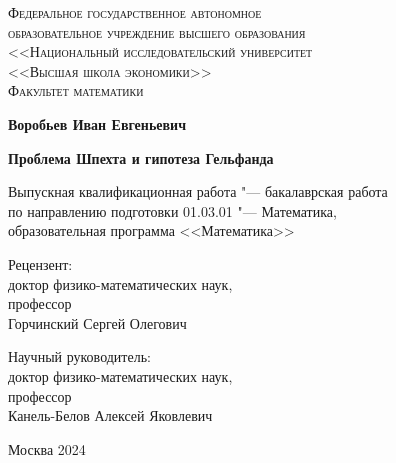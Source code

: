 \begin{center}
{\scshape Федеральное государственное автономное\\
образовательное учреждение высшего образования\\
    <<Национальный исследовательский университет\\
    <<Высшая школа экономики>>\\[1ex]
Факультет математики\par}

    \par\vfill

    \textbf{\large Воробьев Иван Евгеньевич}

    \vspace{1.5cm}

    {\Large\bfseries
    Проблема Шпехта и гипотеза Гельфанда
    \par}

    \vspace{1.5cm}

    Выпускная квалификационная работа "--- бакалаврская работа\\[1ex]
    по направлению подготовки 01.03.01 "--- Математика,\\[1ex]
    образовательная программа <<Математика>>
    \par\vfill
    \noindent\parbox[t]{0.48\textwidth}{%
        Рецензент:\\[3pt]
        доктор физико-математических наук,\\
        профессор\\
        Горчинский Сергей Олегович
    }\hspace{0.04\textwidth}\parbox[t]{0.48\textwidth}{%
        Научный руководитель:\\[3pt]
        доктор физико-математических наук,\\
        профессор\\
        Канель-Белов Алексей Яковлевич\\[2ex]
    }%
    \par\vfill
    Москва 2024
\end{center}
\thispagestyle{empty}
\pagebreak